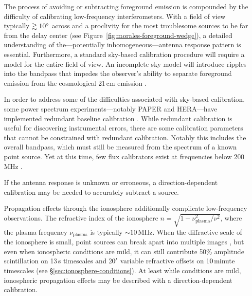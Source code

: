 \begin{bibunit}
The process of avoiding or subtracting foreground emission is compounded by the difficulty of
calibrating low-frequency interferometers.  With a field of view typically $\gtrsim10\mbox{$^\circ$}$ across
and a proclivity for the most troublesome sources to be far from the delay center (see
Figure~\ref{fig:morales-foreground-wedge}), a detailed understanding of the---potentially
inhomogeneous---antenna response pattern is essential. Furthermore, a standard sky-based calibration
procedure will require a model for the entire field of view. An incomplete sky model will introduce
ripples into the bandpass that impedes the observer's ability to separate foreground emission from
the cosmological 21\,cm emission \citep[e.g.,
Figure~\ref{fig:morales-foreground-wedge};][]{2016MNRAS.461.3135B, 2017MNRAS.470.1849E}.

In order to address some of the difficulties associated with sky-based calibration, some power
spectrum experiments---notably PAPER and HERA---have implemented redundant baseline calibration
\citep{2010MNRAS.408.1029L}. While redundant calibration is useful for discovering instrumental
errors, there are some calibration parameters that cannot be constrained with redundant calibration.
Notably this includes the overall bandpass, which must still be measured from the spectrum of a
known point source. Yet at this time, few flux calibrators exist at frequencies below 200\,MHz
\citep{2012MNRAS.423L..30S, 2017ApJS..230....7P}.



If the antenna response is unknown or
erroneous, a direction-dependent calibration may be needed to accurately subtract a source.

\citep{2015PhRvD..91h3514S}

Propagation effects through the ionosphere additionally complicate low-frequency observations. The
refractive index of the ionosphere $n = \sqrt{1 - \nu_\text{plasma}^2/\nu^2}$, where the plasma
frequency $\nu_\text{plasma}$ is typically $\sim10\,\text{MHz}$. When the diffractive scale of the
ionosphere is small, point sources can break apart into multiple images \citep{2015MNRAS.453..925V},
but even when ionospheric conditions are mild, it can still contribute 50\% amplitude scintillation
on 13\,s timescales and 20$\mbox{$^\prime$}$ variable refractive offsets on 10\,minute timescales (see
\S\ref{sec:ionosphere-conditions}).  At least while conditions are mild, ionospheric propagation
effects may be described with a direction-dependent calibration.






\end{bibunit}
